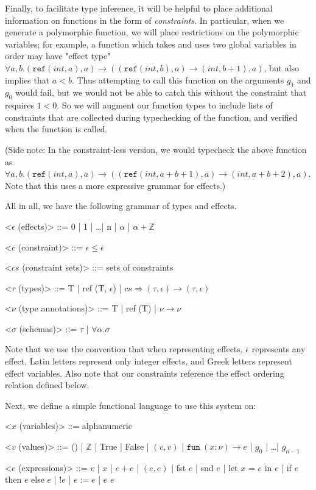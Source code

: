 \documentclass{article}
\newcommand{\Z}{\mathbb{Z}}
\begin{document}
	Finally, to facilitate type inference, it will be helpful to place additional information on functions
	in the form of \emph{constraints}. In particular, when we generate a polymorphic function, we will place restrictions on the polymorphic variables; for example, a function which takes and uses two global variables in order may have "effect type" $\forall a,b. (\texttt{ref}(int, a), a) \rightarrow ((\texttt{ref} (int, b), a) \rightarrow (int, b+1), a)$, but also implies that $a < b$. Thus attempting to call this function on the arguments $g_1$ and $g_0$ would fail, but we would not be able to catch this without the constraint that requires $1 < 0$. So we will augment our function types to include lists of constraints that are collected during typechecking of the function, and verified when the function is called.
	
	(Side note: In the constraint-less version, we would typecheck the above function as $\forall a,b. (\texttt{ref}(int, a), a) \rightarrow ((\texttt{ref} (int, a+b+1), a) \rightarrow (int, a+b+2), a)$.
	Note that this uses a more expressive grammar for effects.)
	
	All in all, we have the following grammar of types and effects.
	
	\begin{grammar}
		<$\epsilon$ (effects)> ::= 0 | 1 | \dots | n | $\alpha$ | $\alpha + \Z$
		
		<$c$ (constraint)> ::= $\epsilon \leq \epsilon$
		
		<$cs$ (constraint sets)> ::= sets of constraints
		
		<$\tau$ (types)> ::= T | ref (T, $\epsilon$) | $cs \Rightarrow (\tau, \epsilon) \rightarrow (\tau, \epsilon)$
		
		<$\nu$ (type annotations)> ::= T | ref (T) | $\nu \rightarrow \nu$
		
		<$\sigma$ (schemas)> ::= $\tau$ | $\forall \alpha.\sigma$
	\end{grammar}
	
	Note that we use the convention that when representing effects, $\epsilon$ represents any effect, Latin letters represent only integer effects, and Greek letters represent effect variables. Also note that our constraints reference the effect ordering relation defined below.
	
	Next, we define a simple functional language to use this system on:
	
	\begin{grammar}
		<$x$ (variables)> ::= alphanumeric
		
		<$v$ (values)> ::= () | $\Z$ | True | False | $(v, v)$ | $\texttt{fun}\ (x:\nu) \rightarrow e$ | $g_0$ | \dots | $g_{n-1}$
		
		<$e$ (expressions)> ::= $v$ | $x$ | $e + e$ | $(e,e)$ | fst $e$ | snd $e$ | let $x$ = $e$ in $e$ | if $e$ then $e$ else $e$ | !$e$ | $e := e$ | $e$ $e$
	\end{grammar} 
	
\end{document}
